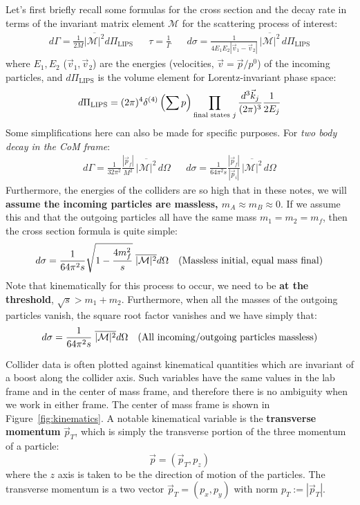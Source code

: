 \documentclass[11pt, oneside]{article}   	%
\theoremstyle{definition}
\numberwithin{equation}{subsection}		%
\begin{document}
Let's first briefly recall some formulas for the cross section and the decay rate in terms of the invariant matrix element $\mathcal M$ for the 
scattering process of interest:
\begin{align}
	d\Gamma = \frac{1}{2 M} \overline{|\mathcal M|^2} d\Pi_\mathrm{LIPS} && \tau = \frac{1}{\Gamma} && d\sigma = \frac{1}{4 E_1 E_2 |\vec v_1 - \vec v_2|}\,
	\overline{|\mathcal M|^2}\,d\Pi_\mathrm{LIPS}
\end{align}
where $E_1, E_2$ ($\vec v_1, \vec v_2$) are the energies (velocities, $\vec v = \vec p / p^0$) of the incoming particles, and 
$d\Pi_\mathrm{LIPS}$ is the volume element for Lorentz-invariant phase space:
\begin{equation}
	d\Pi_\mathrm{LIPS} = (2\pi)^4 \delta^{(4)}\left(\sum p\right) \prod_{\textnormal{final states } j} \frac{d^3\vec k_j}{(2\pi)^3} \frac{1}{2 E_j}
\end{equation}
Some simplifications here can also be made for specific purposes. For \textit{two body decay in the CoM frame}:
\begin{align}
	d\Gamma = \frac{1}{32\pi^2} \frac{|\vec p_f|}{M^2}\,\overline{|\mathcal M|^2}\,d\Omega && 
	d\sigma = \frac{1}{64\pi^2 s}\frac{|\vec p_f|}{|\vec p_i|}\,\overline{|\mathcal M|^2}\,d\Omega  \nonumber
\end{align}
Furthermore, the energies of the colliders are so high that in these notes, we will \textbf{assume the incoming particles are massless, 
$m_A \approx m_B\approx 0$}. If we assume this and that the outgoing particles all have the same mass $m_1 = m_2 = m_f$, then 
the cross section formula is quite simple:
\begin{align}
	d\sigma = \frac{1}{64\pi^2 s}\sqrt{1 - \frac{4 m_f^2}{s}} \;\overline{|\mathcal M|^2} d\Omega && (\textnormal{Massless initial, equal mass 
	final}) 
\end{align}
Note that kinematically for this process to occur, we need to be \textbf{at the threshold}, $\sqrt s > m_1 + m_2$. Furthermore, when all the 
masses of the outgoing particles vanish, the square root factor vanishes and we have simply that:
\begin{align}
	d\sigma = \frac{1}{64\pi^2 s} \;\overline{|\mathcal M|^2} d\Omega && (\textnormal{All incoming/outgoing particles massless}) \nonumber
\end{align}

Collider data is often plotted against kinematical quantities which are invariant of a boost along the collider axis. 
Such variables have the same values in the lab frame and in the center of mass frame, and therefore there is no ambiguity when we work in 
either frame. The center of mass frame is shown in Figure~\ref{fig:kinematics}. A notable 
kinematical variable is the \textbf{transverse momentum} $\vec p_T$, which is simply the transverse portion of the three momentum of a 
particle:
\begin{equation}
	\vec p = (\vec p_T, p_z)
\end{equation}
where the $z$ axis is taken to be the direction of motion of the particles. The transverse momentum is a two vector $\vec p_T = (p_x, p_y)$ with norm $p_T := |\vec p_T|$. 
\end{document}
